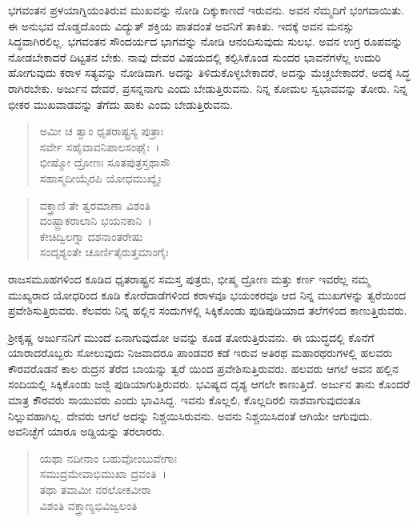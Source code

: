ಭಗವಂತನ ಪ್ರಳಯಾಗ್ನಿಯಂತಿರುವ ಮುಖವನ್ನು ನೋಡಿ ದಿಕ್ಕುಕಾಣದೆ ಇರುವನು. ಅವನ ನೆಮ್ಮದಿಗೆ ಭಂಗವಾಯಿತು. ಈ ಅನುಭವ ದೊಡ್ಡದೊಂದು ವಿದ್ಯುತ್ ಶಕ್ತಿಯ ಪಾತದಂತೆ ಅವನಿಗೆ ತಾಕಿತು. ಇದಕ್ಕೆ ಅವನ ಮನಸ್ಸು ಸಿದ್ಧವಾಗಿರಲಿಲ್ಲ. ಭಗವಂತನ ಸೌಂದರ್ಯದ ಭಾಗವನ್ನು ನೋಡಿ ಆನಂದಿಸುವುದು ಸುಲಭ. ಅವನ ಉಗ್ರ ರೂಪವನ್ನು ನೋಡಬೇಕಾದರೆ ದಿಟ್ಟತನ ಬೇಕು. ನಾವು ದೇವರ ವಿಷಯದಲ್ಲಿ ಕಲ್ಪಿಸಿಕೊಂಡ ಸುಂದರ ಭಾವನೆಗಳೆಲ್ಲ ಉದುರಿ ಹೋಗುವುದು ಕರಾಳ ಸತ್ಯವನ್ನು ನೋಡಿದಾಗ. ಅದನ್ನು ತಿಳಿದುಕೊಳ್ಳಬೇಕಾದರೆ, ಅದನ್ನು ಮೆಚ್ಚಬೇಕಾದರೆ, ಅದಕ್ಕೆ ಸಿದ್ಧ ರಾಗಿರಬೇಕು. ಅರ್ಜುನ ದೇವರೆ, ಪ್ರಸನ್ನನಾಗು ಎಂದು ಬೇಡುತ್ತಿರುವನು. ನಿನ್ನ ಕೋಮಲ ಸ್ವಭಾವವನ್ನು ತೋರು. ನಿನ್ನ ಭೀಕರ ಮುಖವಾಡವನ್ನು ತೆಗೆದು ಹಾಕು ಎಂದು ಬೇಡುತ್ತಿರುವನು.

\begin{verse}
ಅಮೀ ಚ ತ್ವಾಂ ಧೃತರಾಷ್ಟ್ರಸ್ಯ ಪುತ್ರಾಃ \\ ಸರ್ವೇ ಸಹೈವಾವನಿಪಾಲಸಂಘೈಃ~।\\ಭೀಷ್ಮೋ ದ್ರೋಣಃ ಸೂತಪುತ್ರಸ್ತಥಾಸೌ \\ ಸಹಾಸ್ಮದೀಯೈರಪಿ ಯೋಧಮುಖ್ಯೈಃ 
\end{verse}

\begin{verse}
ವಕ್ತ್ರಾಣಿ ತೇ ತ್ವರಮಾಣಾ ವಿಶಂತಿ \\ ದಂಷ್ಟ್ರಾಕರಾಲಾನಿ ಭಯನಕಾನಿ~।\\ಕೇಚಿದ್ವಿಲಗ್ನಾ ದಶನಾಂತರೇಷು \\ ಸಂದೃಶ್ಯಂತೇ ಚೂರ್ಣಿತೈರುತ್ತಮಾಂಗೈಃ 
\end{verse}

{\small ರಾಜಸಮೂಹಗಳಿಂದ ಕೂಡಿದ ಧೃತರಾಷ್ಟ್ರನ ಸಮಸ್ತ ಪುತ್ರರು, ಭೀಷ್ಮ ದ್ರೋಣ ಮತ್ತು ಕರ್ಣ ಇವರೆಲ್ಲ ನಮ್ಮ ಮುಖ್ಯರಾದ ಯೋಧರಿಂದ ಕೂಡಿ ಕೋರೆದಾಡೆಗಳಿಂದ ಕರಾಳವೂ ಭಯಂಕರವೂ ಆದ ನಿನ್ನ ಮುಖಗಳನ್ನು ತ್ವರೆಯಿಂದ ಪ್ರವೇಶಿಸುತ್ತಿರುವರು. ಕೆಲವರು ನಿನ್ನ ಹಲ್ಲಿನ ಸಂದುಗಳಲ್ಲಿ ಸಿಕ್ಕಿಕೊಂಡು ಪುಡಿಪುಡಿಯಾದ ತಲೆಗಳಿಂದ ಕಾಣುತ್ತಿರುವರು.}

ಶ‍್ರೀಕೃಷ್ಣ ಅರ್ಜುನನಿಗೆ ಮುಂದೆ ಏನಾಗುವುದೋ ಅವನ್ನು ಕೂಡ ತೋರುತ್ತಿರುವನು. ಈ ಯುದ್ಧದಲ್ಲಿ ಕೊನೆಗೆ ಯಾರಾದರೊಬ್ಬರು ಸೋಲುವುದು ನಿಜವಾದರೂ ಪಾಂಡವರ ಕಡೆ ಇರುವ ಅತಿರಥ ಮಹಾರಥರುಗಳಲ್ಲಿ ಹಲವರು ಕೌರವರೊಡನೆ ಕಾಲ ರುದ್ರನ ತೆರೆದ ಬಾಯನ್ನು ತ್ವರೆ ಯಿಂದ ಪ್ರವೇಶಿಸುತ್ತಿರುವರು. ಹಲವರು ಆಗಲೆ ಅವನ ಹಲ್ಲಿನ ಸಂದಿಯಲ್ಲಿ ಸಿಕ್ಕಿಕೊಂಡು ಜಜ್ಜಿ ಪುಡಿಯಾಗುತ್ತಿರುವರು. ಭವಿಷ್ಯದ ದೃಶ್ಯ ಆಗಲೇ ಕಾಣುತ್ತಿದೆ. ಅರ್ಜುನ ತಾನು ಕೊಂದರೆ ಮಾತ್ರ ಕೌರವರು ಸಾಯುವರು ಎಂದು ಭಾವಿಸಿದ್ದ. ಇವನು ಕೊಲ್ಲಲಿ, ಕೊಲ್ಲದಿರಲಿ ನಾಶವಾಗುವುದಂತೂ ನಿಲ್ಲುವಹಾಗಿಲ್ಲ. ದೇವರು ಆಗಲೆ ಅದನ್ನು ನಿಶ್ಚಯಿಸಿರುವನು. ಅವನು ನಿಶ್ಚಯಿಸಿದಂತೆ ಆಗಿಯೇ ಆಗುವುದು. ಅವನಿಚ್ಛೆಗೆ ಯಾರೂ ಅಡ್ಡಿಯನ್ನು ತರಲಾರರು.

\begin{verse}
ಯಥಾ ನದೀನಾಂ ಬಹುವೋಂಬುವೇಗಾಃ \\ ಸಮುದ್ರಮೇವಾಭಿಮುಖಾ ದ್ರವಂತಿ~।\\ತಥಾ ತವಾಮೀ ನರಲೋಕವೀರಾ \\ ವಿಶಂತಿ ವಕ್ತ್ರಾಣ್ಯಭಿವಿಜ್ವಲಂತಿ 
\end{verse}

